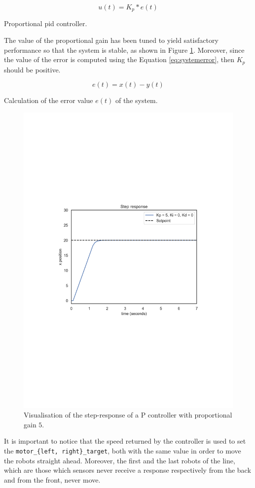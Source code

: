 \begin{Equation}[!h]
	\centering
	\begin{equation}
	u(t) = K_p * e(t)
	\end{equation}
	\caption[Proportioal PID controller.]{Proportional \gls{pid} controller.}
	\label{eq:pid}
\end{Equation}

The value of the proportional gain has been tuned to yield satisfactory 
performance so that the system is stable, as shown in Figure \ref{fig:pid}. 
Moreover, since the value of the error is computed using the Equation 
\ref{eq:systemerror}, then $K_p$ should be positive.

\begin{Equation}[!h]
	\centering
	\begin{equation}
	e(t) = x(t) - y(t)
	\end{equation}
	\caption{Calculation of the error value $e(t)$ of the system.}
	\label{eq:systemerror}
\end{Equation}

\begin{figure}[htb]
	\centering
	\includegraphics[width=.5\textwidth]{contents/images/Step-responsep=kp5ki0kd0}
	\caption[Step response of the proportinal PID controller.]{Visualisation of the 
	step-response of a P controller with proportional 
	gain $5$.}
	\label{fig:pid}
\end{figure}

It is important to notice that the speed returned by the controller is used to set the 
\texttt{motor\_\{left, right\}\_target}, both with the same value in order to move 
the robots straight ahead. Moreover, the first and the last robots of the line, which 
are those which sensors never receive a response respectively from the back and 
from the front, never move.


